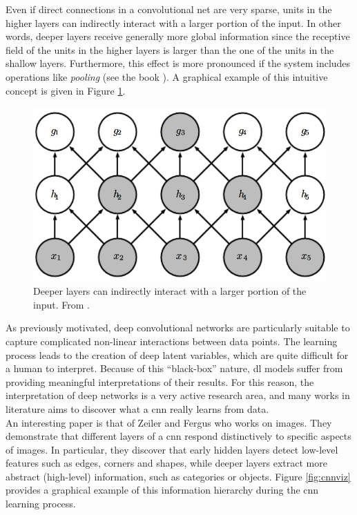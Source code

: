 Even if direct connections in a convolutional net are very sparse, units in the higher layers can indirectly interact with a larger portion of the input. In other words, deeper layers receive generally more global information since the receptive field of the units in the higher layers is larger than the one of the units in the shallow layers. Furthermore, this effect is more pronounced if the system includes operations like \textit{pooling} (see the book \cite{goodfellow2016deep}). A graphical example of this intuitive concept is given in Figure \ref{fig:deeperlayers}. \\
\begin{figure}[H]
	\begin{center}
		\includegraphics[scale=.5]{img/deeperlayers.png}
		\captionsetup{margin=2cm}
		\caption{Deeper layers can indirectly interact with a larger portion of the input.
From \cite{goodfellow2016deep}.}
		\label{fig:deeperlayers}
	\end{center}
\end{figure}
\noindent As previously motivated, deep convolutional networks are particularly suitable to capture complicated non-linear interactions between data points. The learning process leads to the creation of deep latent variables, which are quite difficult for a human to interpret. Because of this “black-box” nature, \gls{dl} models suffer from providing meaningful interpretations of their results. For this reason, the interpretation of deep networks is a very active research area, and many works in literature aims to discover what a \gls{cnn} really learns from data.\\
An interesting paper is that of Zeiler and Fergus \cite{zeiler2014visualizing} who works on images. They demonstrate that different layers of a \gls{cnn} respond distinctively to specific aspects of images. In particular, they discover that early hidden layers detect low-level features such as edges, corners and shapes, while deeper layers extract more abstract (high-level) information, such as categories or objects. Figure \ref{fig:cnnviz} provides a graphical example of this information hierarchy during the \gls{cnn} learning process.\\
